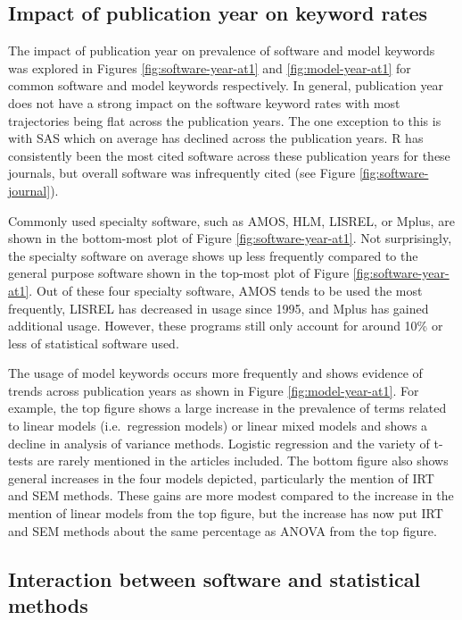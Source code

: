 \documentclass[english,,man]{apa6}
\begin{document}
\hypertarget{impact-of-publication-year-on-keyword-rates}{%
\subsection{Impact of publication year on keyword rates}\label{impact-of-publication-year-on-keyword-rates}}

The impact of publication year on prevalence of software and model keywords was explored in Figures \ref{fig:software-year-at1} and \ref{fig:model-year-at1} for common software and model keywords respectively. In general, publication year does not have a strong impact on the software keyword rates with most trajectories being flat across the publication years. The one exception to this is with SAS which on average has declined across the publication years. R has consistently been the most cited software across these publication years for these journals, but overall software was infrequently cited (see Figure \ref{fig:software-journal}).

Commonly used specialty software, such as AMOS, HLM, LISREL, or Mplus, are shown in the bottom-most plot of Figure \ref{fig:software-year-at1}. Not surprisingly, the specialty software on average shows up less frequently compared to the general purpose software shown in the top-most plot of Figure \ref{fig:software-year-at1}. Out of these four specialty software, AMOS tends to be used the most frequently, LISREL has decreased in usage since 1995, and Mplus has gained additional usage. However, these programs still only account for around 10\% or less of statistical software used.

The usage of model keywords occurs more frequently and shows evidence of trends across publication years as shown in Figure \ref{fig:model-year-at1}. For example, the top figure shows a large increase in the prevalence of terms related to linear models (i.e.~regression models) or linear mixed models and shows a decline in analysis of variance methods. Logistic regression and the variety of t-tests are rarely mentioned in the articles included. The bottom figure also shows general increases in the four models depicted, particularly the mention of IRT and SEM methods. These gains are more modest compared to the increase in the mention of linear models from the top figure, but the increase has now put IRT and SEM methods about the same percentage as ANOVA from the top figure.

\hypertarget{interaction-between-software-and-statistical-methods}{%
\subsection{Interaction between software and statistical methods}\label{interaction-between-software-and-statistical-methods}}
\end{document}
